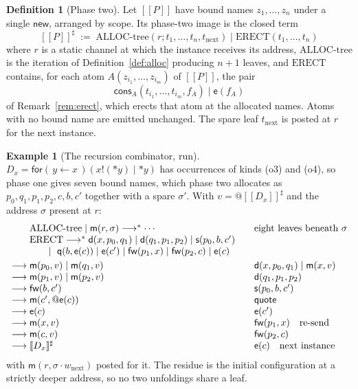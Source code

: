 \documentclass[11pt]{article}
\makeatletter
\theoremstyle{plain}
\theoremstyle{definition}
\newtheorem{definition}[theorem]{Definition}
\newtheorem{example}[theorem]{Example}
\theoremstyle{remark}
\newcommand{\quo}[1]{@#1}
\newcommand{\drp}[1]{{*}#1}
\newcommand{\inp}[3]{\mathsf{for}(\,#1 \leftarrow #2\,)#3}
\newcommand{\out}[2]{#1!(#2)}
\newcommand{\enc}[1]{[\![#1]\!]}
\newcommand{\mm}{\mathsf{m}}
\newcommand{\dd}{\mathsf{d}}
\newcommand{\fw}{\mathsf{fw}}
\newcommand{\sy}{\mathsf{s}}
\newcommand{\ev}{\mathsf{e}}
\newcommand{\qq}{\mathsf{q}}
\newcommand{\cons}{\mathsf{cons}}
\newcommand{\red}{\longrightarrow}
\newcommand{\wred}{\longrightarrow^{*}}
\makeatother
\begin{document}
\begin{definition}[Phase two]
\label{def:phase2}
Let $\enc{P}$ have bound names $z_{1},\dots,z_{n}$ under a single
$\mathsf{new}$, arranged by scope. Its phase-two image is the closed term
\[
  \enc{P}^{\sharp} \;:=\;
  \mathrm{ALLOC\text{-}tree}(r; t_{1},\dots,t_{n},t_{\mathrm{next}})
  \mid \mathrm{ERECT}(t_{1},\dots,t_{n})
\]
where $r$ is a static channel at which the instance receives its address,
$\mathrm{ALLOC\text{-}tree}$ is the iteration of
Definition~\ref{def:alloc} producing $n+1$ leaves, and $\mathrm{ERECT}$
contains, for each atom $A(z_{i_{1}},\dots,z_{i_{m}})$ of $\enc{P}$, the pair
\[
  \cons_{A}(t_{i_{1}},\dots,t_{i_{m}},f_{A}) \mid \ev(f_{A})
\]
of Remark~\ref{rem:erect}, which erects that atom at the allocated names.
Atoms with no bound name are emitted unchanged. The spare leaf
$t_{\mathrm{next}}$ is posted at $r$ for the next instance.
\end{definition}

\begin{example}[The recursion combinator, run]
\label{ex:dx}
$D_{x} = \inp{y}{x}{(\out{x}{\drp{y}} \mid \drp{y})}$ has occurrences of
kinds (o3) and (o4), so phase one gives seven bound names, which phase two
allocates as $p_{0},q_{1},p_{1},p_{2},c,b,c'$ together with a spare
$\sigma'$. With $v = \quo{\enc{D_{x}}^{\sharp}}$ and the address $\sigma$
present at $r$:
\[
\begin{array}{r@{\;}l@{\qquad}l}
 & \mathrm{ALLOC\text{-}tree} \mid \mm(r,\sigma) \wred \cdots
   & \text{eight leaves beneath } \sigma\\
 & \mathrm{ERECT} \wred
   \dd(x,p_{0},q_{1}) \mid \dd(q_{1},p_{1},p_{2}) \mid \sy(p_{0},b,c')
   & \\
 & \qquad \mid\ \qq(b,\ev(c)) \mid \ev(c') \mid \fw(p_{1},x) \mid \fw(p_{2},c)
   \mid \ev(c) & \\[3pt]
 \red & \mm(p_{0},v) \mid \mm(q_{1},v) & \dd(x,p_{0},q_{1}) \mid \mm(x,v)\\
 \red & \mm(p_{1},v) \mid \mm(p_{2},v) & \dd(q_{1},p_{1},p_{2})\\
 \red & \fw(b,c') & \sy(p_{0},b,c')\\
 \red & \mm(c',\quo{\ev(c)}) & \mathsf{quote}\\
 \red & \ev(c) & \ev(c')\\
 \red & \mm(x,v) & \fw(p_{1},x) \quad \text{re-send}\\
 \red & \mm(c,v) & \fw(p_{2},c)\\
 \red & \enc{D_{x}}^{\sharp} & \ev(c) \quad \text{next instance}
\end{array}
\]
with $\mm(r,\sigma\!\cdot\!w_{\mathrm{next}})$ posted for it. The residue is
the initial configuration at a strictly deeper address, so no two unfoldings
share a leaf.
\end{example}
\end{document}
